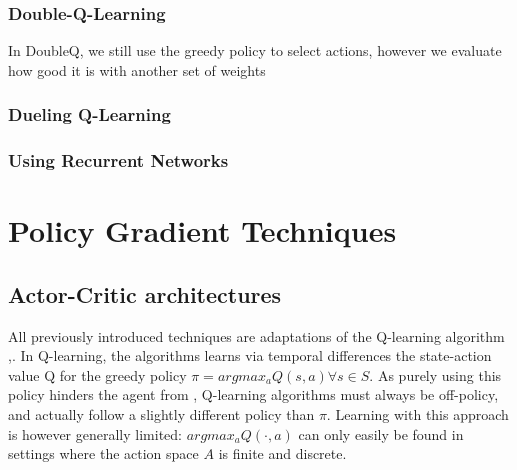 
\subsubsection{Double-Q-Learning}
In DoubleQ, we still use the greedy policy to select actions, however we evaluate how good it is with another set of weights


\subsubsection{Dueling Q-Learning}

\subsubsection{Using Recurrent Networks}

\section{Policy Gradient Techniques}

\subsection{Actor-Critic architectures}

All previously introduced techniques are adaptations of the Q-learning algorithm \cite{sutton_learning_1988},\cite{watkins_learning_1989}. In Q-learning, the algorithms learns via temporal differences the state-action value Q for the greedy policy $\pi = argmax_a Q(s,a) \forall s \in S$. As purely using this policy hinders the agent from , Q-learning algorithms must always be off-policy, and actually follow a slightly different policy than $\pi$. Learning with this approach is however generally limited: $argmax_aQ(\cdot, a)$ can only easily be found in settings where the action space $A$ is finite and discrete.\\

